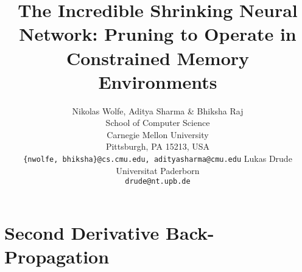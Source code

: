 \documentclass{article} %
\title{The Incredible Shrinking Neural Network: Pruning to Operate in Constrained Memory Environments}
\author{Nikolas Wolfe, Aditya Sharma \& Bhiksha Raj\\
School of Computer Science\\
Carnegie Mellon University\\
Pittsburgh, PA 15213, USA \\
\texttt{\{nwolfe, bhiksha\}@cs.cmu.edu, adityasharma@cmu.edu}
\And
Lukas Drude \\
Universitat Paderborn\\
\texttt{drude@nt.upb.de} \\
}
\begin{document}
\maketitle












\newpage
\begin{center}
\end{center}

\section{Second Derivative Back-Propagation}\label{apd:first}


\end{document}
